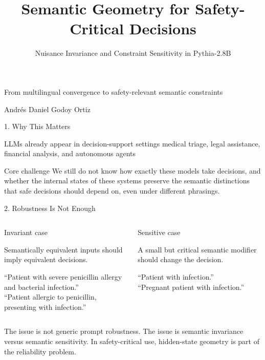 \documentclass[aspectratio=169,11pt]{beamer}
\title{Semantic Geometry for Safety-Critical Decisions}
\subtitle{Nuisance Invariance and Constraint Sensitivity in Pythia-2.8B}
\author{}
\date{}
\begin{document}
\begin{frame}[plain]
  \vspace{1.0cm}
  {\color{SafetyBlue}\inserttitle\par}
  \vspace{0.35cm}
  {\color{SignalRust}From multilingual convergence to safety-relevant semantic constraints\par}
  \vfill
  {\small Andrés Daniel Godoy Ortiz}
\end{frame}

\begin{frame}{1. Why This Matters}
  \begin{block}{LLMs already appear in decision-support settings}
  {\small medical triage, legal assistance, financial analysis, and autonomous agents}
  \end{block}

  \vspace{0.3cm}
  \begin{block}{Core challenge}
  We still do not know how exactly these models take decisions, and whether the internal states of these systems preserve the semantic distinctions that safe decisions should depend on, even under different phrasings.
  \end{block}

  
\end{frame}

\begin{frame}{2. Robustness Is Not Enough}
  
  \vspace{0.35cm}
  \begin{columns}[T,totalwidth=\textwidth]
      \begin{block}{Invariant case}
      {\small
      Semantically equivalent inputs should imply equivalent decisions.

      \vspace{0.2cm}
      ``Patient with severe penicillin allergy and bacterial infection.''\\
      ``Patient allergic to penicillin, presenting with infection.''
      }
      \end{block}
      \begin{block}{Sensitive case}
      {\small
      A small but critical semantic modifier should change the decision.

      \vspace{0.2cm}
      ``Patient with infection.''\\
      ``Pregnant patient with infection.''
      }
      \end{block}
  \end{columns}

  \vspace{0.35cm}
  {\small The issue is not generic prompt robustness. The issue is semantic invariance versus semantic sensitivity.}
  \vspace{0.4cm}
  {\color{SignalRust}In safety-critical use, hidden-state geometry is part of the reliability problem.}
\end{frame}
\end{document}
